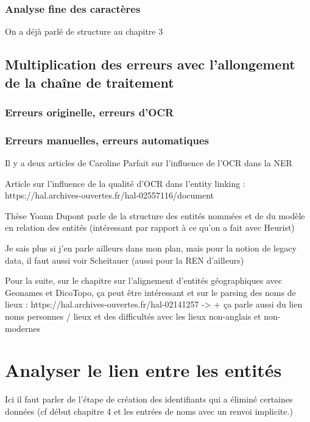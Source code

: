 \documentclass[a4paper,12pt,twoside]{book}
\begin{document}
	\subsection{Analyse fine des caractères}
	
	On a déjà parlé de structure au chapitre 3
	
	\section{Multiplication des erreurs avec l’allongement de la chaîne de traitement}
	
	\subsection{Erreurs originelle, erreurs d’OCR}
	
	\subsection{Erreurs manuelles, erreurs automatiques}
	
	
		Il y a deux articles de Caroline Parfait sur l'influence de l'OCR dans la NER
	
	Article sur l'influence de la qualité d'OCR dans l'entity linking : 
	https://hal.archives-ouvertes.fr/hal-02557116/document
	
	Thèse Yoann Dupont parle de la structure des entités nommées et de du modèle en relation des entités (intéressant par rapport à ce qu'on a fait avec Heurist)
	
	Je sais plus si j'en parle ailleurs dans mon plan, mais pour la notion de legacy data, il faut aussi voir Scheitauer (aussi pour la REN d'ailleurs)
	
	Pour la suite, sur le chapitre sur l'alignement d'entités géographiques avec Geonames et DicoTopo, ça peut être intéressant et sur le parsing des noms de lieux : https://hal.archives-ouvertes.fr/hal-02141257
	-> + ça parle aussi du lien noms personnes / lieux et des difficultés avec les lieux non-anglais et non-modernes
	
	\chapter{Analyser le lien entre les entités}
	
	Ici il faut parler de l'étape de création des identifiants qui a éliminé certaines données (cf début chapitre 4 et les entrées de noms avec un renvoi implicite.)
	
\end{document}
